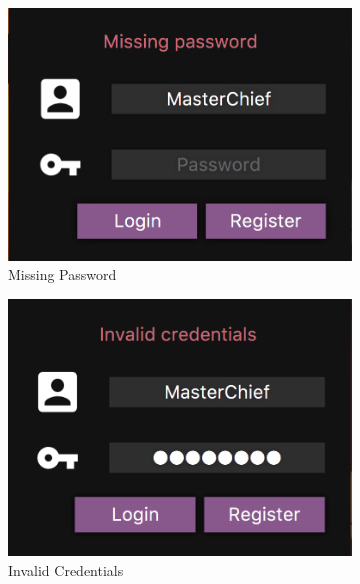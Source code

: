 \documentclass[12pt, titlepage]{scrartcl}
\begin{document}
\begin{figure}[H]
\begin{subfigure}[h]{0.3\linewidth}
                        \includegraphics[width=\linewidth]{images/old_state/login/MissingPassword.png}
                        \caption{Missing Password}
                    \end{subfigure}
                    \begin{subfigure}[h]{0.3\linewidth}
                        \includegraphics[width=\linewidth]{images/old_state/login/InvalidCredentials.png}
                        \caption{Invalid Credentials}
                    \end{subfigure}
                    \begin{subfigure}[h]{0.3\linewidth}

\end{subfigure}
\end{figure}
\end{document}
